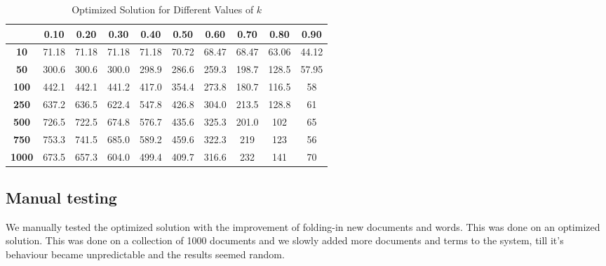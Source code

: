 \documentclass[12pt,a4paper]{article}
\begin{document}
\begin{table}[h!]
    \centering
    \setlength{\arrayrulewidth}{0.5mm} %
    \renewcommand{\arraystretch}{1.5} %
    \begin{tabular}{|c|c|c|c|c|c|c|c|c|c|}
    \hline
    \rowcolor{black!75} %
    & \color{white}\textbf{0.10} & \color{white}\textbf{0.20} & \color{white}\textbf{0.30} & \color{white}\textbf{0.40} & \color{white}\textbf{0.50} & \color{white}\textbf{0.60} & \color{white}\textbf{0.70} & \color{white}\textbf{0.80} & \color{white}\textbf{0.90} \\ \hline
    \cellcolor{black!75}\color{white}\textbf{10}   & 71.18 & 71.18 & 71.18 & 71.18 & 70.72 & 68.47 & 68.47 & 63.06 & 44.12 \\ \hline
    \cellcolor{black!75}\color{white}\textbf{50}    & 300.6 & 300.6 & 300.0 & 298.9 & 286.6 & 259.3 & 198.7 & 128.5 & 57.95 \\ \hline
    \cellcolor{black!75}\color{white}\textbf{100}   & 442.1 & 442.1 & 441.2 & 417.0 & 354.4 & 273.8 & 180.7 & 116.5 & 58 \\ \hline
    \cellcolor{black!75}\color{white}\textbf{250}   & 637.2 & 636.5 & 622.4 & 547.8 & 426.8 & 304.0 & 213.5 & 128.8 & 61 \\ \hline
    \cellcolor{black!75}\color{white}\textbf{500}   & 726.5 & 722.5 & 674.8 & 576.7 & 435.6 & 325.3 & 201.0 & 102 & 65 \\ \hline
    \cellcolor{black!75}\color{white}\textbf{750}   & 753.3 & 741.5 & 685.0 & 589.2 & 459.6 & 322.3 & 219 & 123 & 56 \\ \hline
    \cellcolor{black!75}\color{white}\textbf{1000}  & 673.5 & 657.3 & 604.0 & 499.4 & 409.7 & 316.6 & 232 & 141 & 70 \\ \hline
    \end{tabular}
    \caption{Optimized Solution for Different Values of $k$}
\end{table}

\subsection{Manual testing}
We manually tested the optimized solution with the improvement of folding-in new documents and words. This was done on an optimized solution. This was done on a collection of 1000 documents and we slowly added more documents and terms to the system, till it's behaviour became unpredictable and the results seemed random.
\end{document}
